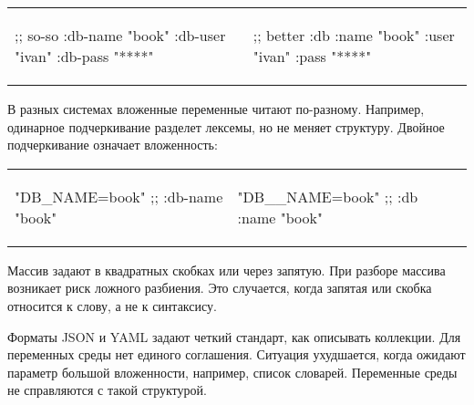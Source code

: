 \noindent
\begin{tabular}{ @{}p{5cm} @{}p{5cm} }

\begin{english}
  \begin{clojure}
;; so-so
{:db-name "book"
 :db-user "ivan"
 :db-pass "****"}
  \end{clojure}
\end{english}

&

\begin{english}
  \begin{clojure}
;; better
{:db {:name "book"
      :user "ivan"
      :pass "****"}}
  \end{clojure}
\end{english}

\end{tabular}

В разных системах вложенные переменные читают по-разному. Например, одинарное
подчеркивание разделет лексемы, но не меняет структуру. Двойное подчеркивание
означает вложенность:

\noindent
\begin{tabular}{ @{}p{5cm} @{}p{5cm} }

\begin{english}
  \begin{clojure}
"DB_NAME=book"
;; {:db-name "book"}
  \end{clojure}
\end{english}

&

\begin{english}
  \begin{clojure}
"DB__NAME=book"
;; {:db {:name "book"}}
  \end{clojure}
\end{english}

\end{tabular}


Массив задают в квадратных скобках или через запятую. При разборе массива
возникает риск ложного разбиения. Это случается, когда запятая или скобка
относится к слову, а не к синтаксису.


Форматы JSON и YAML задают четкий стандарт, как описывать коллекции. Для
переменных среды нет единого соглашения. Ситуация ухудшается, когда ожидают
параметр большой вложенности, например, список словарей. Переменные среды не
справляются с такой структурой.

